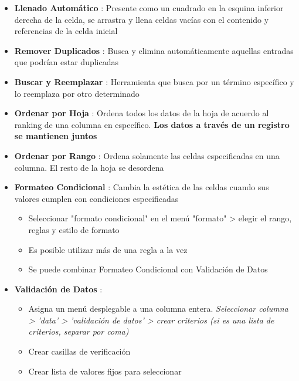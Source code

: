 \begin{itemize}
    \item {\textbf{Llenado Automático} : Presente como un cuadrado en la esquina inferior derecha de la celda, se arrastra y llena celdas vacías con el contenido y referencias de la celda inicial}
    \item {\textbf{Remover Duplicados} : Busca y elimina automáticamente aquellas entradas que podrían estar duplicadas} 
    \item {\textbf{Buscar y Reemplazar} : Herramienta que busca por un término específico y lo reemplaza por otro determinado}
    \item {\textbf{Ordenar por Hoja} : Ordena todos los datos de la hoja de acuerdo al ranking de una columna en específico. \textbf{Los datos a través de un registro se mantienen juntos}}
    \item {\textbf{Ordenar por Rango} : Ordena solamente las celdas especificadas en una columna. El resto de la hoja se desordena}
    \item {\textbf{Formateo Condicional} : Cambia la estética de las celdas cuando sus valores cumplen con condiciones especificadas
        \begin{itemize}
            \item {Seleccionar "formato condicional" en el menú "formato" > elegir el rango, reglas y estilo de formato}
            \item {Es posible utilizar más de una regla a la vez}
            \item {Se puede combinar Formateo Condicional con Validación de Datos}
        \end{itemize}}
    \item {\textbf{Validación de Datos} : 
    \begin{itemize}
        \item {Asigna un menú desplegable a una columna entera. \textit{Seleccionar columna > 'data' > 'validación de datos' > crear criterios (si es una lista de criterios, separar por coma)}}
        \item {Crear casillas de verificación}
        \item {Crear lista de valores fijos para seleccionar}
        

\end{itemize}}
\end{itemize}

